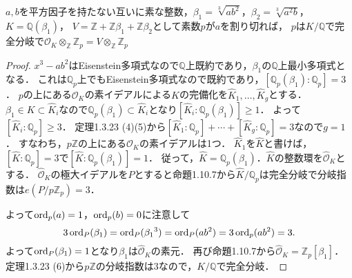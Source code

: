 \begin{screen}
  $a, b$を平方因子を持たない互いに素な整数，$\beta_1=\sqrt[3]{ab^2}$，$\beta_2=\sqrt[3]{a^2b}$，$K=\mathbb{Q}(\beta_1)$，
  $V=\mathbb{Z}+\mathbb{Z}\beta_1+\mathbb{Z}\beta_2$として素数$p$が$a$を割り切れば，
  $p$は$K/\mathbb{Q}$で完全分岐で$\mathcal{O}_K\otimes_\mathbb{Z}\mathbb{Z}_p = V\otimes_\mathbb{Z}\mathbb{Z}_p$
\end{screen}
\begin{proof}
  $x^3-ab^2$はEisenstein多項式なので$\mathbb{Q}$上既約であり，$\beta_1$の$\mathbb{Q}$上最小多項式となる．
  これは$\mathbb{Q}_p$上でもEisenstein多項式なので既約であり，$[\mathbb{Q}_p(\beta_1):\mathbb{Q}_p]=3$．
  $p$の上にある$\mathcal{O}_K$の素イデアルによる$K$の完備化を$\widehat{K}_1, \ldots, \widehat{K}_g$とする．
  $\beta_1 \in K \subset \widehat{K}_i$なので$\mathbb{Q}_p(\beta_1) \subset \widehat{K}_i$となり$[\widehat{K}_i:\mathbb{Q}_p(\beta_1)]\geq1$．
  よって$[\widehat{K}_i:\mathbb{Q}_p]\geq3$．
  定理1.3.23 (4)(5)から$[\widehat{K}_1:\mathbb{Q}_p] + \cdots + [\widehat{K}_g:\mathbb{Q}_p] = 3$なので$g=1$．
  すなわち，$p\mathbb{Z}$の上にある$\mathcal{O}_K$の素イデアルは1つ．
  $\widehat{K}_1$を$\widehat{K}$と書けば，$[\widehat{K}:\mathbb{Q}_p]=3$で$[\widehat{K}:\mathbb{Q}_p(\beta_1)]=1$．
  従って，$\widehat{K} = \mathbb{Q}_p(\beta_1)$．$\widehat{K}$の整数環を$\widehat{\mathcal{O}}_K$とする．
  $\widehat{\mathcal{O}}_K$の極大イデアルを$P$とすると命題1.10.7から$\widehat{K}/\mathbb{Q}_p$は完全分岐で分岐指数は$e(P/p\mathbb{Z}_p)=3$．

  よって$\operatorname{ord}_p(a)=1$，$\operatorname{ord}_p(b)=0$に注意して
  \[3\operatorname{ord}_P(\beta_1)=\operatorname{ord}_P(\beta_1{}^3)=\operatorname{ord}_P(ab^2)=3\operatorname{ord}_p(ab^2)=3.\]
  よって$\operatorname{ord}_P(\beta_1)=1$となり$\beta_1$は$\widehat{\mathcal{O}}_K$の素元．
  再び命題1.10.7から$\widehat{\mathcal{O}}_K=\mathbb{Z}_p[\beta_1]$．
  定理1.3.23 (6)から$p\mathbb{Z}$の分岐指数は$3$なので，$K/\mathbb{Q}$で完全分岐．


\end{proof}
